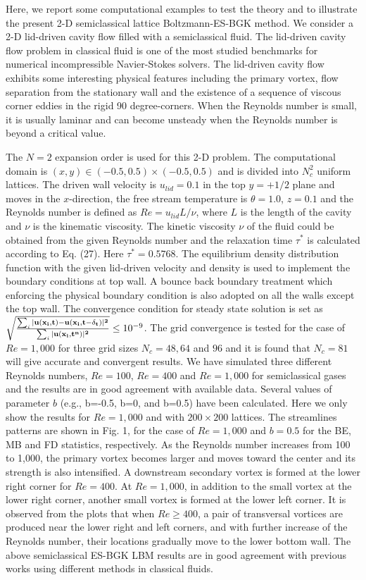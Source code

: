 \documentclass[doublecol]{epl2}
\begin{document}
Here, we report some computational examples to test the theory and to illustrate the present 2-D semiclassical lattice Boltzmann-ES-BGK method. We consider a 2-D lid-driven cavity flow filled with a semiclassical fluid. The lid-driven cavity flow problem in classical fluid is one of the most studied benchmarks for numerical incompressible Navier-Stokes solvers.  The lid-driven cavity flow exhibits some interesting physical features including the primary vortex, flow separation from the stationary wall and the existence of a sequence of viscous corner eddies in the rigid 90 degree-corners. When the Reynolds number is small, it is usually laminar and can become unsteady when the Reynolds number is beyond a critical value.

The $N=2$ expansion order is used for this 2-D problem. The computational domain is $(x,y) \in  (-0.5,0.5)\times(-0.5,0.5)$ and is divided into $N_c^2$ uniform lattices.   The driven wall velocity is $u_{lid}=0.1$ in the top $y=+1/2$ plane and moves in the $x$-direction, the free stream temperature is $\theta=1.0$, $z=0.1$ and the Reynolds number is defined as $Re =u_{lid} L/\nu$, where $L$ is the length of the cavity and $\nu$ is the kinematic viscosity.   The kinetic viscosity $\nu$ of the fluid could be obtained from the given Reynolds number and the relaxation time $\tau^*$ is calculated according to Eq. (27).  Here  $\tau^*=0.5768$.  The equilibrium density distribution function with the given lid-driven velocity and density is used to implement the boundary conditions at top wall.  A bounce back boundary treatment which enforcing the physical boundary condition is also adopted on all the walls except the top wall.
The convergence condition for steady state solution is set as $ \sqrt{ \frac{ \sum_i |\bf{u} (\bf{x}_i, t)-\bf{u} (\bf{x}_i, t-\delta_t)|^2}{\sum_i |\bf{u} (\bf{x}_i, t^n)|^2 } } \leq 10^{-9}$.  The grid convergence is tested for the case of $Re=1,000$ for three grid sizes $N_c=48, 64$ and $96$ and it is found that $N_c=81$ will give accurate and convergent results.  We have simulated three different Reynolds numbers, $Re=100$, $Re=400$ and $Re=1,000$ for semiclassical gases and the results are in good agreement with available data.  Several values of parameter $b$ (e.g., b=-0.5, b=0, and b=0.5) have been calculated. Here we only show the results for $Re=1,000$ and with $200 \times 200$ lattices.   The streamlines patterns are shown in Fig. 1, for the case of $Re=1,000$ and $b=0.5$ for the BE, MB and FD statistics, respectively.
As the Reynolds number increases from 100 to 1,000, the primary vortex becomes larger and moves toward the center and its strength is also intensified. A downstream secondary vortex is formed at the lower right corner for $Re=400$.  At $Re=1,000$, in addition to the small vortex at the lower right corner, another small vortex is formed at the lower left corner. It is observed from the plots that when $Re \ge 400$, a pair of transversal vortices are produced near the lower right and left corners, and with further increase of the Reynolds number, their locations gradually move to the lower bottom wall. The above semiclassical ES-BGK LBM results are in good agreement with previous works \cite{Yang1998, YuD2003, Alben2005} using different methods in classical fluids.
\end{document}
